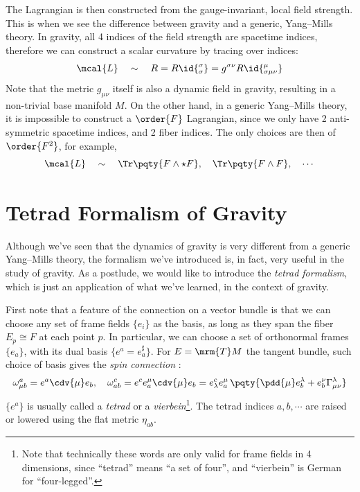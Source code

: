\documentclass[a4paper,11pt]{article}
\begin{document}
	The Lagrangian is then constructed from the gauge-invariant, local field strength. This is when we see the difference between gravity and a generic, Yang--Mills theory. In gravity, all 4 indices of the field strength are spacetime indices, therefore we can construct a scalar curvature by tracing over indices: 
	\begin{equation}
		\mcal{L}
		\quad\sim\quad
			R
			= R\id{^\sigma_\sigma}
			= g^{\sigma\nu} R\id{^\mu_{\sigma\mu\nu}}
		\pagebreak
	\end{equation}
	Note that the metric $g_{\mu\nu}$ itself is also a dynamic field in gravity, resulting in a non-trivial base manifold $M$. On the other hand, in a generic Yang--Mills theory, it is impossible to construct a $\order{F}$ Lagrangian, since we only have 2 anti-symmetric spacetime indices, and 2 fiber indices. The only choices are then of $\order{F^2}$, for example,
	\begin{equation}
		\mcal{L}
		\quad\sim\quad
			\Tr \pqty{F\wedge\star F},\quad
			\Tr \pqty{F\wedge F},\quad
			\cdots
	\end{equation}
\section{Tetrad Formalism of Gravity}
	Although we've seen that the dynamics of gravity is very different from a generic Yang--Mills theory, the formalism we've introduced is, in fact, very useful in the study of gravity. As a postlude, we would like to introduce the \textit{tetrad formalism}, which is just an application of what we've learned, in the context of gravity. 
	
	First note that a feature of the connection on a vector bundle is that we can choose any set of frame fields $\{e_i\}$ as the basis, as long as they span the fiber $E_p \cong F$ at each point $p$. In particular, we can choose a set of orthonormal frames $\{e_a\}$, with its dual basis $\{e^a = e_a^\sharp\}$. For $E = \mrm{T}M$ the tangent bundle, such choice of basis gives the \textit{spin connection} \cite{Compere:2018aar}:
	\begin{equation}
		\omega^a_{\mu b}
		= e^a \cdv{\mu} e_b,
	\quad
		\omega^c_{a b}
		= e^c e_a^\mu \cdv{\mu} e_b
		= e^c_\lambda e_a^\mu \,\pqty{
				\pdd{\mu} e_b^\lambda
				+ e_b^\nu \Gamma^\lambda_{\mu\nu}
			}
	\end{equation}
	$\{e^a\}$ is usually called a \textit{tetrad} or a \textit{vierbein}\footnote{
		Note that technically these words are only valid for frame fields in 4 dimensions, since ``tetrad'' means ``a set of four'', and ``vierbein'' is German for ``four-legged''. 
	}. The tetrad indices $a,b,\cdots$ are raised or lowered using the flat metric $\eta_{ab}$. 
	
\end{document}
